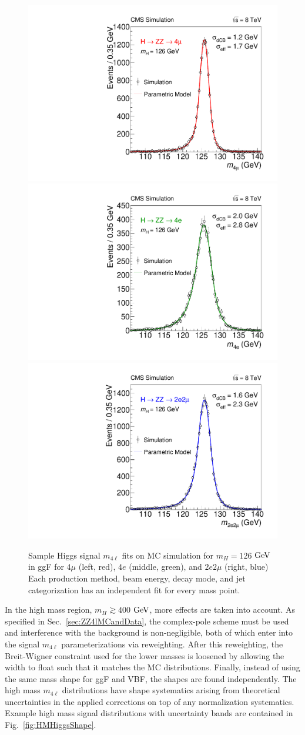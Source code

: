 \begin{figure}[htbp]
\begin{center}
\includegraphics[width=.3\linewidth]{HiggsDiscovery/figures/fitM126_channel0.pdf}
\includegraphics[width=.3\linewidth]{HiggsDiscovery/figures/fitM126_channel1.pdf}
\includegraphics[width=.3\linewidth]{HiggsDiscovery/figures/fitM126_channel2.pdf}
\caption[Low Mass Higgs Signal Mass Shapes]{Sample Higgs signal $m_{4\ell}$ fits on MC simulation for $m_H=126$ $\rm{GeV}$ in ggF for $4\mu$ (left, red), $4e$ (middle, green), and $2e2\mu$ (right, blue) Each production method, beam energy, decay mode, and jet categorization has an independent fit for every mass point.}
\label{fig:LMHiggsShape}
\end{center}
\end{figure}

In the high mass region, $m_H \gtrsim 400$ $\rm{GeV}$, more effects are taken into account. As specified in Sec.~\ref{sec:ZZ4lMCandData}, the complex-pole scheme must be used and interference with the background is non-negligible, both of which enter into the signal $m_{4\ell}$ parameterizations via reweighting. After this reweighting, the Breit-Wigner constraint used for the lower masses is loosened by allowing the width to float such that it matches the MC distributions. Finally, instead of using the same mass shape for ggF and VBF, the shapes are found independently. The high mass $m_{4\ell}$ distributions have shape systematics arising from theoretical uncertainties in the applied corrections on top of any normalization systematics. Example high mass signal distributions with uncertainty bands are contained in Fig.~\ref{fig:HMHiggsShape}.


